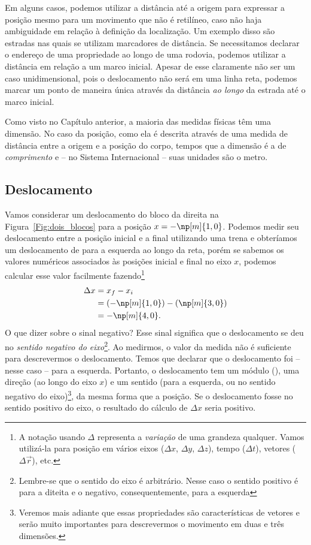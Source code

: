 Em alguns casos, podemos utilizar a distância até a origem para expressar a posição mesmo para um movimento que não é retilíneo, caso não haja ambiguidade em relação à definição da localização. Um exemplo disso são estradas nas quais se utilizam marcadores de distância. Se necessitamos declarar o endereço de uma propriedade ao longo de uma rodovia, podemos utilizar a distância em relação a um marco inicial. Apesar de esse claramente não ser um caso unidimensional, pois o deslocamento não será em uma linha reta, podemos marcar um ponto de maneira única através da distância \emph{ao longo} da estrada até o marco inicial.

Como visto no Capítulo anterior, a maioria das medidas físicas têm uma dimensão. No caso da posição, como ela é descrita através de uma medida de distância entre a origem e a posição do corpo, tempos que a dimensão é a de \emph{comprimento} e -- no Sistema Internacional -- suas unidades são o metro.

\subsection{Deslocamento}

Vamos considerar um deslocamento do bloco da direita na Figura~\ref{Fig:dois_blocos} para a posição $x = -\np[m]{1,0}$. Podemos medir seu deslocamento entre a posição inicial e a final utilizando uma trena e obteríamos um deslocamento de  para a esquerda ao longo da reta, porém se sabemos os valores numéricos associados às posições inicial e final no eixo $x$, podemos calcular esse valor facilmente fazendo\footnote{A notação usando $\Delta$ representa a \emph{variação} de uma grandeza qualquer. Vamos utilizá-la para posição em vários eixos ($\Delta x$, $\Delta y$, $\Delta z$), tempo ($\Delta t$), vetores ($\Delta\vec{r}$), etc.}
\begin{align}
  \Delta x &= x_f - x_i \\
  &= (-\np[m]{1,0}) - (\np[m]{3,0}) \\
  &= -\np[m]{4,0}.
\end{align}
%
O que dizer sobre o sinal negativo? Esse sinal significa que o deslocamento se deu no \emph{sentido negativo do eixo}\footnote{Lembre-se que o sentido do eixo é arbitrário. Nesse caso o sentido positivo é para a diteita e o negativo, consequentemente, para a esquerda}. Ao medirmos, o valor da medida não é suficiente para descrevermos o deslocamento. Temos que declarar que o deslocamento foi -- nesse caso -- para a esquerda. Portanto, o deslocamento tem um módulo (), uma direção (ao longo do eixo $x$) e um sentido (para a esquerda, ou no sentido negativo do eixo)\footnote{Veremos mais adiante que essas propriedades são características de vetores e serão muito importantes para descrevermos o movimento em duas e três dimensões.}, da mesma forma que a posição. Se o deslocamento fosse no sentido positivo do eixo, o resultado do cálculo de $\Delta x$ seria positivo. 

